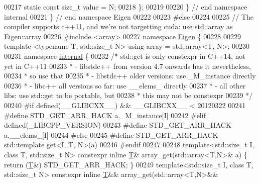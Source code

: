 \begin{DoxyCode}
00217   \textcolor{keyword}{static} \textcolor{keyword}{const} \textcolor{keywordtype}{size\_t} value = N;
00218 \};
00219 
00220 \}  \textcolor{comment}{// end namespace internal}
00221 \}  \textcolor{comment}{// end namespace Eigen}
00222 
00223 \textcolor{preprocessor}{#else}
00224 
00225 \textcolor{comment}{// The compiler supports c++11, and we're not targetting cuda: use std::array as Eigen::array}
00226 \textcolor{preprocessor}{#include <array>}
00227 \textcolor{keyword}{namespace }\hyperlink{namespace_eigen}{Eigen} \{
00228 
00229 \textcolor{keyword}{template} <\textcolor{keyword}{typename} T, std::\textcolor{keywordtype}{size\_t} N> \textcolor{keyword}{using} array = std::array<T, N>;
00230 
00231 \textcolor{keyword}{namespace }\hyperlink{namespaceinternal}{internal} \{
00232 \textcolor{comment}{/* std::get is only constexpr in C++14, not yet in C++11}
00233 \textcolor{comment}{ *     - libstdc++ from version 4.7 onwards has it nevertheless,}
00234 \textcolor{comment}{ *                                          so use that}
00235 \textcolor{comment}{ *     - libstdc++ older versions: use \_M\_instance directly}
00236 \textcolor{comment}{ *     - libc++ all versions so far: use \_\_elems\_ directly}
00237 \textcolor{comment}{ *     - all other libs: use std::get to be portable, but}
00238 \textcolor{comment}{ *                       this may not be constexpr}
00239 \textcolor{comment}{ */}
00240 \textcolor{preprocessor}{#if defined(\_\_GLIBCXX\_\_) && \_\_GLIBCXX\_\_ < 20120322}
00241 \textcolor{preprocessor}{#define STD\_GET\_ARR\_HACK             a.\_M\_instance[I]}
00242 \textcolor{preprocessor}{#elif defined(\_LIBCPP\_VERSION)}
00243 \textcolor{preprocessor}{#define STD\_GET\_ARR\_HACK             a.\_\_elems\_[I]}
00244 \textcolor{preprocessor}{#else}
00245 \textcolor{preprocessor}{#define STD\_GET\_ARR\_HACK             std::template get<I, T, N>(a)}
00246 \textcolor{preprocessor}{#endif}
00247 
00248 \textcolor{keyword}{template}<std::\textcolor{keywordtype}{size\_t} I, \textcolor{keyword}{class} T, std::\textcolor{keywordtype}{size\_t} N> constexpr \textcolor{keyword}{inline} \hyperlink{group___sparse_core___module_class_eigen_1_1_triplet}{T}&       array\_get(std::array<T,N>&      
       a) \{ \textcolor{keywordflow}{return} (\hyperlink{group___sparse_core___module_class_eigen_1_1_triplet}{T}&)       STD\_GET\_ARR\_HACK; \}
00249 \textcolor{keyword}{template}<std::\textcolor{keywordtype}{size\_t} I, \textcolor{keyword}{class} T, std::\textcolor{keywordtype}{size\_t} N> constexpr \textcolor{keyword}{inline} \hyperlink{group___sparse_core___module_class_eigen_1_1_triplet}{T}&&      array\_get(std::array<T,N>&&     

\end{DoxyCode}
